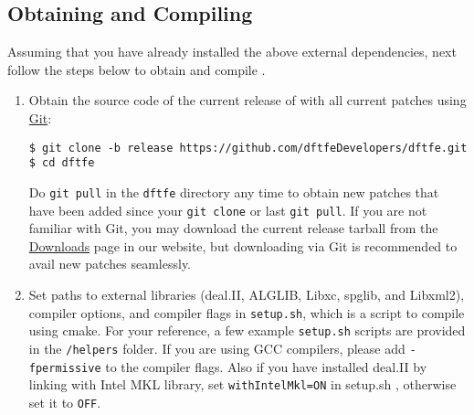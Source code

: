 \subsection{Obtaining and Compiling \dftfe{}}
Assuming that you have already installed the above external dependencies, next follow the steps below to obtain and compile \dftfe{}.
\begin{enumerate}
\item Obtain the source code of the current release of \dftfe{} with all current patches using \href{https://git-scm.com/}{Git}:
\begin{verbatim}
$ git clone -b release https://github.com/dftfeDevelopers/dftfe.git
$ cd dftfe
\end{verbatim}
Do \verb|git pull| in the \verb|dftfe| directory any time to obtain new patches that have been added since your \verb|git clone| or last \verb|git pull|.
If you are not familiar with Git, you may download the current release tarball from the \href{https://sites.google.com/umich.edu/dftfe/download}{Downloads} page in our website, but downloading via Git is recommended to avail new patches seamlessly. 





\item Set paths to external libraries (deal.II, ALGLIB, Libxc, spglib, and Libxml2), compiler options, and compiler flags in \verb|setup.sh|, which is a script to compile \dftfe{} using cmake. For your reference, a few example \verb|setup.sh| scripts are provided in the \verb|/helpers| folder. If you are using GCC compilers, please add \verb|-fpermissive| to the compiler flags. Also if you have installed deal.II by linking with Intel MKL library, set \verb|withIntelMkl=ON| in setup.sh , otherwise set it to \verb|OFF|. 


\end{enumerate}

